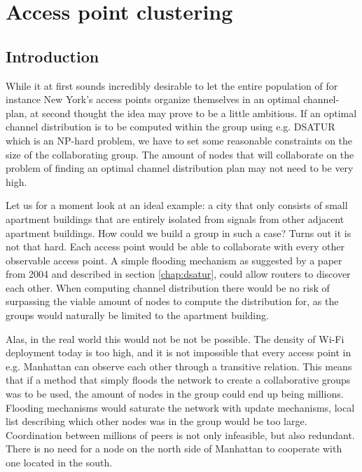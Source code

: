 \chapter{Access point clustering} \label{chap:clustering}



\section{Introduction}
While it at first sounds incredibly desirable to let the entire population of for instance New York's access points organize themselves in an optimal channel-plan,
at second thought the idea may prove to be a little ambitious. If an optimal channel distribution is to be computed within the group using e.g. DSATUR \cite{Brelaz} which
is an NP-hard problem, we have to set some reasonable constraints on the size of the collaborating group. The amount of nodes that will collaborate on the problem of finding an optimal channel distribution plan may not need to be very high.

Let us for a moment look at an ideal example: a city that only consists of small apartment buildings that are entirely isolated from signals from other adjacent apartment buildings.
How could we build a group in such a case? Turns out it is not that hard. Each access point would be able to collaborate with every other observable access point. A simple flooding mechanism
as suggested by a paper from 2004\cite{mahonen} and described in section \ref{chap:dsatur}, could allow routers to discover each other. When computing channel distribution there would be no risk of surpassing the viable amount of nodes to compute the distribution for, as the groups would naturally be limited to the apartment building.

Alas, in the real world this would not be not be possible. The density of Wi-Fi deployment today is too high, and it is not impossible that every access point in e.g. Manhattan can observe each other through a transitive relation. This means that if a method that simply floods the network to create a collaborative groups was to be used, the amount of nodes in the group could end up being millions.
Flooding mechanisms would saturate the network with update mechanisms, local list describing which other nodes was in the group would be too large. Coordination between millions of peers
is not only infeasible, but also redundant. There is no need for a node on the north side of Manhattan to cooperate with one located in the south. 

